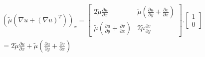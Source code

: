 % 
\begin{eqnarray*}
 (\tilde\mu (\nabla  u + (\nabla  u)^T))_x = \begin{bmatrix} 2\tilde\mu\frac{\partial u}{\partial x} & \tilde\mu\left(\frac{\partial u}{\partial y}+\frac{\partial v}{\partial x}\right) \\ 
 \tilde\mu\left(\frac{\partial u}{\partial y}+\frac{\partial v}{\partial x}\right) & 2\tilde\mu\frac{\partial v}{\partial y}  \end{bmatrix}
 .\begin{bmatrix}1 \\0 \end{bmatrix} \\
 = 2\tilde\mu\frac{\partial u}{\partial x} + \tilde\mu\left(\frac{\partial u}{\partial y}+\frac{\partial v}{\partial x}\right)
\end{eqnarray*}
